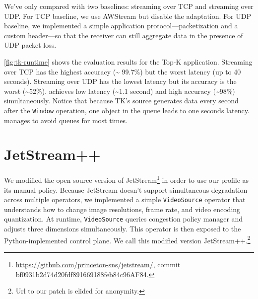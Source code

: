\documentclass[twocolumn, 9pt]{article}
\begin{document}
We've only compared \sysname{} with two baselines: streaming over TCP and
streaming over UDP. For TCP baseline, we use AWStream but disable the
adaptation. For UDP baseline, we implemented a simple application
protocol---packetization and a custom header---so that the receiver can still
aggregate data in the presence of UDP packet loss.

\autoref{fig:tk-runtime} shows the evaluation results for the Top-K
application. Streaming over TCP has the highest accuracy (\textasciitilde
99.7\%) but the worst latency (up to 40 seconds). Streaming over UDP has the
lowest latency but its accuracy is the worst (\textasciitilde 52\%). \sysname{}
achieves low latency (\textasciitilde 1.1 second) and high accuracy
(\textasciitilde 98\%) simultaneously. Notice that because TK's source generates
data every second after the \texttt{Window} operation, one object in the queue
leads to one seconds latency. \sysname{} manages to avoid queues for most times.


\section{JetStream++}
\label{appendix:jetstream++}

We modified the open source version of
JetStream\footnote{\url{https://github.com/princeton-sns/jetstream/}, commit
  bf0931b2d74d20fdf891669188feb84c96AF84.} in order to use our profile as its
manual policy. Because JetStream doesn't support simultaneous degradation across
multiple operators, we implemented a simple \texttt{VideoSource} operator that
understands how to change image resolutions, frame rate, and video encoding
quantization. At runtime, \texttt{VideoSource} queries congestion policy manager
and adjusts three dimensions simultaneously. This operator is then exposed to
the Python-implemented control plane. We call this modified version
JetStream++.\footnote{Url to our patch is elided for anonymity.}
\end{document}
